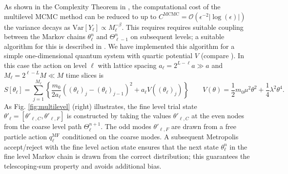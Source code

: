\documentclass[11pt]{article}
\begin{document}
As shown in the Complexity Theorem in \cite{Dodwell2015}, the computational cost of the multilevel MCMC method can be reduced to up to $C^{\text{MCMC}}=\mathcal{O}(\epsilon^{-2}|\log(\epsilon)|)$ the variance decays as $\text{Var}[Y_\ell]\propto M_\ell^{-\beta}$. This requires requires suitable coupling between the Markov chains $\theta_\ell^n$ and $\Theta_{\ell-1}^n$ on subsequent levels; a suitable algorithm for this is described in \cite{Dodwell2015}. We have implemented this algorithm for a simple one-dimensional quantum system with quartic potential $V$ (compare \cite{Creutz1981}). In this case the action on level $\ell$ with lattice spacing $a_\ell=2^{L-\ell}a\gg a$ and $M_\ell=2^{\ell-L}M\ll M$ time slices is
\begin{equation}
  S\left[\theta_\ell\right] = \sum_{j=1}^{M_\ell} \left\{\frac{m_0}{2a_\ell}\left((\theta_\ell)_j-(\theta_\ell)_{j-1}\right)^2 + a_\ell V\left((\theta_\ell)_j\right)\right\}\qquad V(\theta) = \frac{1}{2}m_0\mu^2\theta^2+\frac{1}{4}\lambda^2\theta^4.\label{eqn:quantum_action}
\end{equation}
As Fig. \ref{fig:multilevel} (right) illustrates, the fine level trial state $\theta'_\ell=[\theta'_{\ell,C},\theta'_{\ell,F}]$ is constructed by taking the values $\theta'_{\ell,C}$ at the even nodes from the coarse level path $\Theta_\ell^{n+1}$. The odd modes $\theta'_{\ell,F}$ are drawn from a free particle action $q_{\ell}^{\text{MF}}$ conditioned on the coarse modes. A subsequent Metropolis accept/reject with the fine level action state ensures that the next state $\theta_\ell^n$ in the fine level Markov chain is drawn from the correct distribution; this guarantees the telescoping-sum property and avoids additional bias.
\end{document}
